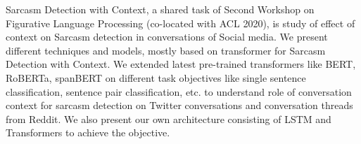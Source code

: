Sarcasm Detection with Context, a shared task of  Second Workshop on Figurative Language Processing (co-located with ACL 2020),  is study of effect of context on Sarcasm detection in conversations of Social media. We present different techniques and models, mostly based on transformer for Sarcasm Detection with Context. We extended latest pre-trained transformers like BERT, RoBERTa, spanBERT on different task objectives like single sentence classification, sentence pair classification, etc. to understand role of conversation context for sarcasm detection on Twitter conversations and conversation threads from Reddit. We also present our own architecture consisting of LSTM and Transformers to achieve the objective.
